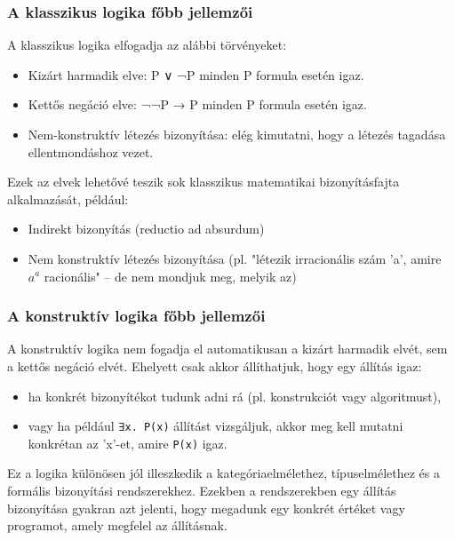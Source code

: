 \subsubsection{A klasszikus logika főbb jellemzői}

A klasszikus logika elfogadja az alábbi törvényeket:

\begin{itemize}
\item Kizárt harmadik elve: P ∨ ¬P minden P formula esetén igaz.
\item Kettős negáció elve: ¬¬P → P minden P formula esetén igaz.
\item Nem-konstruktív létezés bizonyítása: elég kimutatni, hogy a létezés tagadása ellentmondáshoz vezet.
\end{itemize}

Ezek az elvek lehetővé teszik sok klasszikus matematikai bizonyításfajta alkalmazását, például:

\begin{itemize}
\item Indirekt bizonyítás (reductio ad absurdum)
\item Nem konstruktív létezés bizonyítása (pl. "létezik irracionális szám 'a', amire $a ^ a$ racionális" – de nem mondjuk meg, melyik az)
\end{itemize}

\subsubsection{A konstruktív logika főbb jellemzői}

A konstruktív logika nem fogadja el automatikusan a kizárt harmadik elvét, sem a kettős negáció elvét. Ehelyett csak akkor állíthatjuk, hogy egy állítás igaz:

\begin{itemize}
\item ha konkrét bizonyítékot tudunk adni rá (pl. konstrukciót vagy algoritmust),
\item vagy ha például \texttt{∃x. P(x)} állítást vizsgáljuk, akkor meg kell mutatni konkrétan az 'x'-et, amire \texttt{P(x)} igaz.
\end{itemize}

Ez a logika különösen jól illeszkedik a kategóriaelmélethez, típuselmélethez és a formális bizonyítási rendszerekhez. Ezekben a rendszerekben egy állítás bizonyítása gyakran azt jelenti, hogy megadunk egy konkrét értéket vagy programot, amely megfelel az állításnak.

